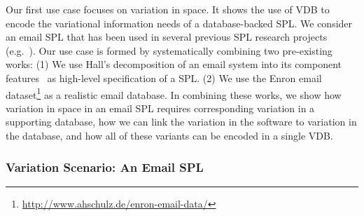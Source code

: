 Our first use case focuses on variation in space.
It shows the use of VDB to encode the variational
information needs of a database-backed SPL. We consider an email
SPL that has been used in several previous SPL research projects (e.g.\
\cite{apel2013strategies,AlHaj19}).
%
%
Our use case is formed by systematically combining two pre-existing works:
%
%
(1) We use Hall's decomposition of an email system into its component
features~\cite{Hall05} as high-level specification of a SPL.
%
(2) We use the Enron email
dataset\footnote{\url{http://www.ahschulz.de/enron-email-data/}} as 
a realistic email database.
%
%
In combining these works, we show how variation in space in an email SPL
requires corresponding variation in a supporting database, how we can link the
variation in the software to variation in the database, and how all of these
variants can be encoded in a single VDB.


\subsubsection{Variation Scenario: An Email SPL}
\label{sec:enron-scenario}


